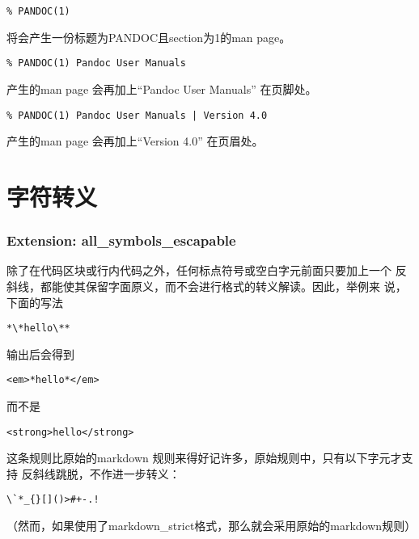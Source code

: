 \documentclass[fancyhdr,bookmark]{ctexbook}
\begin{document}
\begin{lstlisting}
% PANDOC(1)
\end{lstlisting}

将会产生一份标题为PANDOC且section为1的man page。

\begin{lstlisting}
% PANDOC(1) Pandoc User Manuals
\end{lstlisting}

产生的man page 会再加上``Pandoc User Manuals'' 在页脚处。

\begin{lstlisting}
% PANDOC(1) Pandoc User Manuals | Version 4.0
\end{lstlisting}

产生的man page 会再加上``Version 4.0'' 在页眉处。

\section{字符转义}\label{ux5b57ux7b26ux8f6cux4e49}

\subsubsection{Extension:
all\_symbols\_escapable}\label{extension-allux5fsymbolsux5fescapable}

除了在代码区块或行内代码之外，任何标点符号或空白字元前面只要加上一个
反斜线，都能使其保留字面原义，而不会进行格式的转义解读。因此，举例来
说，下面的写法

\begin{lstlisting}
*\*hello\**
\end{lstlisting}

输出后会得到

\begin{lstlisting}
<em>*hello*</em>
\end{lstlisting}

而不是

\begin{lstlisting}
<strong>hello</strong>
\end{lstlisting}

这条规则比原始的markdown
规则来得好记许多，原始规则中，只有以下字元才支持
反斜线跳脱，不作进一步转义：

\begin{lstlisting}
\`*_{}[]()>#+-.!
\end{lstlisting}

（然而，如果使用了markdown\_strict格式，那么就会采用原始的markdown规则）
\end{document}
